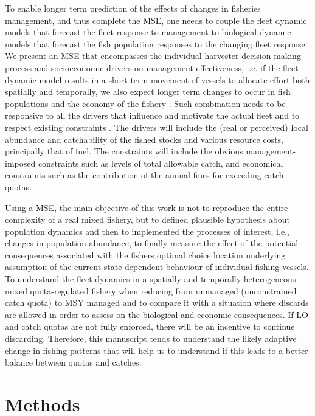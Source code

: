 \documentclass[12pt,oneline,a4paper,numbib]{ouparticle}
\numberwithin{equation}{subsection} %
\begin{document}
To enable longer term prediction of the effects of changes in fisheries management, and thus complete the MSE, one needs to couple the fleet dynamic models that forecast the fleet response to management to  biological dynamic models that forecast the fish population responses to the changing fleet response. We present an MSE that encompasses the individual harvester decision-making process and socioeconomic drivers on management effectiveness, i.e. if the fleet dynamic model results in a short term movement of vessels to allocate effort both spatially and temporally, we also expect longer term changes to occur in fish populations and the economy of the fishery \cite{Alzorriz2018}. Such combination needs to be responsive to all the drivers that influence and motivate the actual fleet and to respect existing constraints \cite{Venables2009}. The drivers will include the (real or perceived) local abundance and catchability of the fished stocks and various resource costs, principally that of fuel. The constraints will include the obvious management-imposed constraints such as levels of total allowable catch, and economical constraints such as the contribution of the annual fines for exceeding catch quotas.

Using a MSE, the main objective of this work is not to reproduce the entire complexity of a real mixed fishery, but to defined plausible hypothesis about population dynamics and then to implemented the processes of interest, i.e., changes in population abundance, to finally measure the effect of the potential consequences associated with the fishers optimal choice location underlying assumption of the current state-dependent behaviour of individual fishing vessels. To understand the fleet dynamics in a spatially and temporally heterogeneous mixed quota-regulated fishery when reducing from unmanaged (unconstrained catch quota) to MSY managed and to compare it with a situation where discards are allowed in order to assess on the biological and economic consequences. If LO and catch quotas are not fully enforced, there will be an incentive to continue discarding. Therefore, this manuscript tends to understand the likely adaptive change in fishing patterns that will help us to understand if this leads to a better balance between quotas and catches.



\section{Methods}
\end{document}
